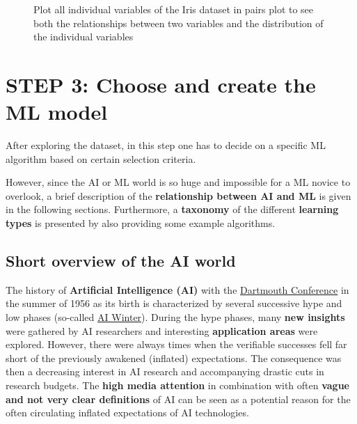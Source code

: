 \documentclass [oneside,10pt,a4paper,ngerman,BCOR10mm,headsepline,parindent,final]{scrartcl}
\begin{document}
    \begin{figure}
        \begin{center}\end{center}
        \caption{Plot all individual variables of the Iris dataset in pairs plot to see both the relationships between two variables and the distribution of the individual variables}
        \label{fig:pairs_plot}
    \end{figure}
    
    \hypertarget{step-3-choose-and-create-the-ml-model}{%
\section{STEP 3: Choose and create the ML
model}\label{step-3-choose-and-create-the-ml-model}}

After exploring the dataset, in this step one has to decide on a
specific ML algorithm based on certain selection criteria.

However, since the AI or ML world is so huge and impossible for a ML
novice to overlook, a brief description of the \textbf{relationship
between AI and ML} is given in the following sections. Furthermore, a
\textbf{taxonomy} of the different \textbf{learning types} is presented
by also providing some example algorithms.

\hypertarget{short-overview-of-the-ai-world}{%
\subsection{Short overview of the AI
world}\label{short-overview-of-the-ai-world}}

The history of \textbf{Artificial Intelligence (AI)} with the
\href{https://en.wikipedia.org/wiki/Dartmouth_workshop}{Dartmouth
Conference} in the summer of 1956 as its birth is characterized by
several successive hype and low phases (so-called
\href{https://de.wikipedia.org/wiki/KI-Winter}{AI Winter}). During the
hype phases, many \textbf{new insights} were gathered by AI researchers
and interesting \textbf{application areas} were explored. However, there
were always times when the verifiable successes fell far short of the
previously awakened (inflated) expectations. The consequence was then a
decreasing interest in AI research and accompanying drastic cuts in
research budgets. The \textbf{high media attention} in combination with
often \textbf{vague and not very clear definitions} of AI can be seen as
a potential reason for the often circulating inflated expectations of AI
technologies.
\end{document}
